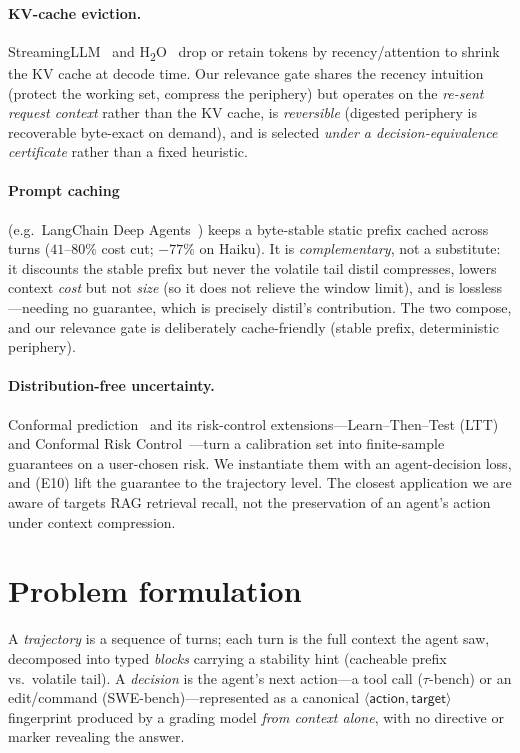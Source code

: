\documentclass{article}
\begin{document}
\paragraph{KV-cache eviction.} StreamingLLM~\cite{streamingllm} and
H\textsubscript{2}O~\cite{h2o} drop or retain tokens by recency/attention to shrink the
KV cache at decode time. Our relevance gate shares the recency intuition (protect the
working set, compress the periphery) but operates on the \emph{re-sent request context}
rather than the KV cache, is \emph{reversible} (digested periphery is recoverable
byte-exact on demand), and is selected \emph{under a decision-equivalence certificate}
rather than a fixed heuristic.
\paragraph{Prompt caching} (e.g.\ LangChain Deep Agents~\cite{deepagents}) keeps a byte-stable
static prefix cached across turns ($41$--$80\%$ cost cut; $-77\%$ on Haiku). It is
\emph{complementary}, not a substitute: it discounts the stable prefix but never the volatile
tail distil compresses, lowers context \emph{cost} but not \emph{size} (so it does not relieve
the window limit), and is lossless---needing no guarantee, which is precisely distil's
contribution. The two compose, and our relevance gate is deliberately cache-friendly (stable
prefix, deterministic periphery).
\paragraph{Distribution-free uncertainty.} Conformal prediction~\cite{vovk} and its
risk-control extensions---Learn--Then--Test (LTT)~\cite{ltt} and Conformal Risk
Control~\cite{crc}---turn a calibration set into finite-sample guarantees on a
user-chosen risk. We instantiate them with an agent-decision loss, and (E10) lift the
guarantee to the trajectory level. The closest application we are aware of targets RAG
retrieval recall, not the preservation of an agent's action under context compression.

\section{Problem formulation}
\label{sec:problem}
A \emph{trajectory} is a sequence of turns; each turn is the full context the agent
saw, decomposed into typed \emph{blocks} carrying a stability hint (cacheable prefix
vs.\ volatile tail). A \emph{decision} is the agent's next action---a tool call
($\tau$-bench) or an edit/command (SWE-bench)---represented as a canonical
$\langle\textsf{action},\textsf{target}\rangle$ fingerprint produced by a grading
model \emph{from context alone}, with no directive or marker revealing the answer.
\end{document}
